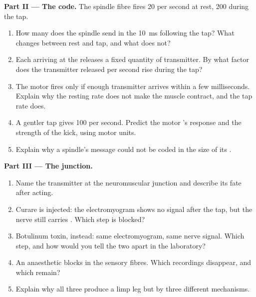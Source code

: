 \begin{problem}
\medskip
\noindent\textbf{Part II --- The code.}
The spindle fibre fires 20  per second at rest, 200
during the tap.
\begin{enumerate}[resume]
  \item How many  does the spindle send in the
        \qty{10}{ms} following the tap? What changes between rest and
        tap, and what does not?
  \item Each  arriving at the  releases a fixed
        quantity of transmitter. By what factor does the transmitter
        released per second rise during the tap?
  \item The motor  fires only if enough transmitter arrives
        within a few milliseconds. Explain why the resting rate does
        not make the muscle contract, and the tap rate does.
  \item A gentler tap gives 100 per second. Predict the motor 's
        response and the strength of the kick, using motor units.
  \item Explain why a spindle's message could not be coded in the size
        of its .
\end{enumerate}

\medskip
\noindent\textbf{Part III --- The junction.}
\begin{enumerate}[resume]
  \item Name the transmitter at the neuromuscular junction and describe
        its fate after acting.
  \item Curare is injected: the electromyogram shows no signal after
        the tap, but the nerve still carries . Which
        step is blocked?
  \item Botulinum toxin, instead: same electromyogram, same nerve
        signal. Which step, and how would you tell the two apart in
        the laboratory?
  \item An anaesthetic blocks  in the sensory
        fibres. Which recordings disappear, and which remain?
  \item Explain why all three produce a limp leg but by three
        different mechanisms.
\end{enumerate}


\end{problem}
